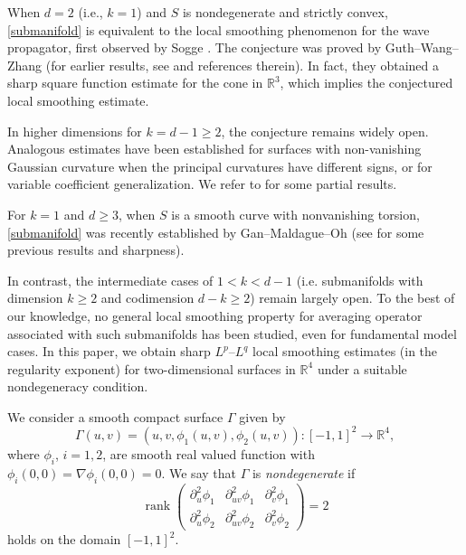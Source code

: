 \documentclass[10pt] %
{amsart}
\theoremstyle{plain}
\numberwithin{equation}{section}
\DeclareMathOperator{\rank}{rank}
\begin{document}
When $d=2$ (i.e., $k=1$) and $S$ is nondegenerate and strictly convex, \eqref{submanifold} is equivalent to the local smoothing phenomenon for the wave propagator, first observed by Sogge \cite{So91}. 
The conjecture was proved by Guth--Wang--Zhang \cite{GWZ} (for earlier results, see \cite{Wo00, MSS, TV, LV, BD0, JLee} and references therein). 
In fact, they obtained a sharp square function estimate for the cone in $\mathbb R^3$, which implies the conjectured local smoothing estimate.

In higher dimensions for  $k=d-1\ge 2$, the conjecture remains widely open.
Analogous estimates have been established for surfaces with non-vanishing Gaussian curvature when the principal curvatures have different signs, or for variable coefficient generalization. 
We refer to \cite{LW02, BD, BHS, BS, GLMX, GW} for some partial results.


 
For $k=1$ and $d \ge 3$, when $S$ is a smooth curve with nonvanishing torsion, \eqref{submanifold} was recently established by Gan--Maldague--Oh \cite{GMO} (see \cite{PS2, BGHS, KLO23, BH} for some previous results and sharpness). 

 
In contrast, the intermediate cases of $1< k<d-1$ (i.e. submanifolds with dimension $k\ge2$ and codimension $d-k\ge2$) remain largely open. 
To the best of our knowledge, no general local smoothing property for averaging operator associated with such submanifolds has been studied, even for fundamental model cases.
In this paper, we obtain sharp $L^p$--$L^q$ local smoothing estimates (in the regularity exponent) for two-dimensional surfaces in $\mathbb{R}^4$ under a suitable nondegeneracy condition. 
 


 
\bigskip




We consider a smooth compact surface $\Gamma$ given by
\[
 \Gamma(u,v) = (u,v,\phi_1(u,v),\phi_2(u,v)) : [-1,1]^2 \to \mathbb R^4  ,
\]
where $\phi_i$, $i=1,2$, are smooth real valued function with $\phi_i(0,0) =\nabla \phi_i (0,0) =  0$. 
We say that $\Gamma$ is \textit{nondegenerate} if 
\begin{equation}\label{2by3rank}
\rank \begin{pmatrix} \partial_{u}^2 \phi_1 &\partial_{uv}^2 \phi_1 & \partial_{v}^2 \phi_1 \\ \partial_{u}^2 \phi_2 & \partial_{uv}^2 \phi_2 & \partial_{v}^2 \phi_2 \end{pmatrix}  = 2
\end{equation}
holds on the domain $[-1,1]^2$.
\end{document}
